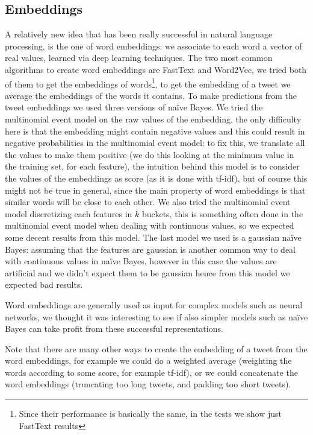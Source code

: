 \subsection*{Embeddings}
A relatively new idea that has been really successful in natural language processing, is the one of word embeddings: we associate to each word a vector of real values, learned via deep learning techniques. The two most common algorithms to create word embeddings are FastText and Word2Vec, we tried both of them to get the embeddings of words\footnote{Since their performance is basically the same, in the tests we show just FastText results}, to get the embedding of a tweet we average the embeddings of the words it contains. To make predictions from the tweet embeddings we used three versions of na\"ive Bayes. We tried the multinomial event model on the raw values of the embedding, the only difficulty here is that the embedding might contain negative values and this could result in negative probabilities in the multinomial event model: to fix this, we translate all the values to make them positive (we do this looking at the minimum value in the training set, for each feature), the intuition behind this model is to consider the values of the embeddings as score (as it is done with tf-idf), but of course this might not be true in general, since the main property of word embeddings is that similar words will be close to each other. We also tried the multinomial event model discretizing each features in $k$ buckets, this is something often done in the multinomial event model when dealing with continuous values, so we expected some decent results from this model. The last model we used is a gaussian na\"ive Bayes: assuming that the features are gaussian is another common way to deal with continuous values in na\"ive Bayes, however in this case the values are artificial and we didn't expect them to be gaussian hence from this model we expected bad results.

Word embeddings are generally used as input for complex models such as neural networks, we thought it was interesting to see if also simpler models such as na\"ive Bayes can take profit from these successful representations.

Note that there are many other ways to create the embedding of a tweet from the word embeddings, for example we could do a weighted average (weighting the words according to some score, for example tf-idf), or we could concatenate the word embeddings (truncating too long tweets, and padding too short tweets).

